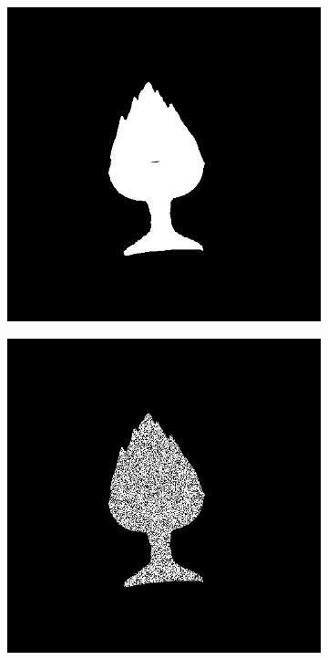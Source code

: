 \documentclass[border=15pt, multi, tikz]{article}
\begin{document}
\begin{figure}[H]
	\centering
	
	\begin{subfigure}[b]{0.20\linewidth}
		\includegraphics[width=\linewidth]{./Figures/test_scenes/05051.depth0.png}
	\end{subfigure}
	\begin{subfigure}[b]{0.20\linewidth}
		\includegraphics[width=\linewidth]{./Figures/test_scenes/05051.depth0_noise.png}

\end{subfigure}
\end{figure}
\end{document}
